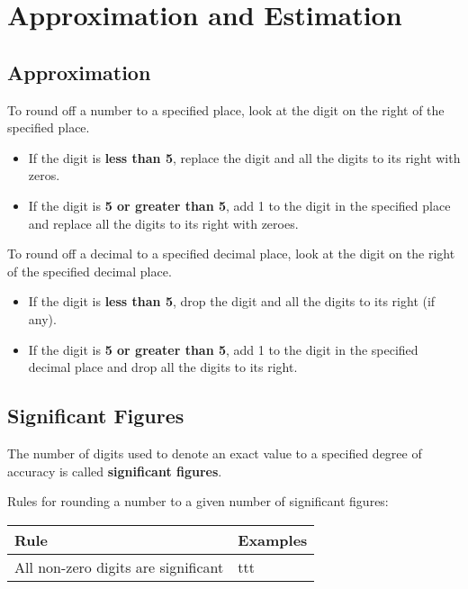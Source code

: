 \documentclass[../main]{subfiles}
\begin{document}
\section{Approximation and Estimation}

\subsection{Approximation}

To round off a number to a specified place, look at the digit on the right of
the specified place.

\begin{itemize}
\item If the digit is \textbf{less than 5}, replace the digit and all the digits
  to its right with zeros.
\item If the digit is \textbf{5 or greater than 5}, add 1 to the digit in the
  specified place and replace all the digits to its right with zeroes.
  
\end{itemize}

To round off a decimal to a specified decimal place, look at the digit on the
right of the specified decimal place.
\begin{itemize}
\item If the digit is \textbf{less than 5}, drop the digit and all the digits to
  its right (if any).
\item If the digit is \textbf{5 or greater than 5}, add 1 to the digit in the
  specified decimal place and drop all the digits to its right.
\end{itemize}

\subsection{Significant Figures}
The number of digits used to denote an exact value to a specified degree of
accuracy is called \textbf{significant figures}.

Rules for rounding a number to a given number of significant figures:

\begin{center}
  \begin{tabularx}{\textwidth}{| l | l |}
    \hline
    Rule    &   Examples \\
    \hline
    All non-zero digits are significant  & ttt
  \end{tabularx}
\end{center}
\end{document}
